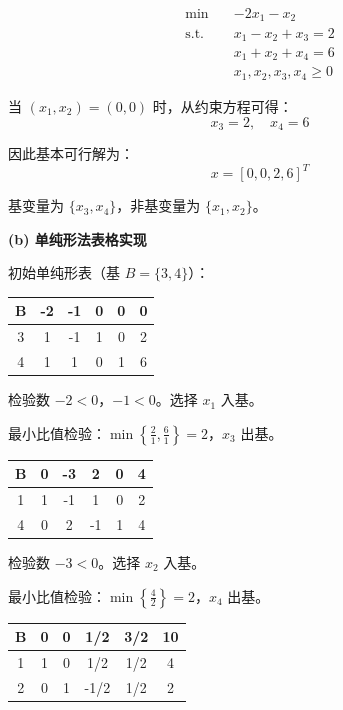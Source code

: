 \documentclass[12pt,a4paper]{article}
\begin{document}
\begin{align*}
\min \quad & -2x_1 - x_2 \\
\text{s.t.} \quad & x_1 - x_2 + x_3 = 2 \\
& x_1 + x_2 + x_4 = 6 \\
& x_1, x_2, x_3, x_4 \geq 0
\end{align*}

当 $(x_1, x_2) = (0, 0)$ 时，从约束方程可得：
\[
x_3 = 2, \quad x_4 = 6
\]

因此基本可行解为：
\[
x = [0, 0, 2, 6]^T
\]

基变量为 $\{x_3, x_4\}$，非基变量为 $\{x_1, x_2\}$。

\textbf{(b) 单纯形法表格实现}

初始单纯形表（基 $B = \{3, 4\}$）：

\begin{table}[h]
\centering
\begin{tabular}{|c|cccc|c|}
\hline
B & -2 & -1 & 0 & 0 & 0 \\
\hline
3 & 1 & -1 & 1 & 0 & 2 \\
4 & 1 & 1 & 0 & 1 & 6 \\
\hline
\end{tabular}
\end{table}

检验数 $-2 < 0$，$-1 < 0$。选择 $x_1$ 入基。

最小比值检验：$\min\left\{\frac{2}{1}, \frac{6}{1}\right\} = 2$，$x_3$ 出基。


\begin{table}[h]
\centering
\begin{tabular}{|c|cccc|c|}
\hline
B & 0 & -3 & 2 & 0 & 4 \\
\hline
1 & 1 & -1 & 1 & 0 & 2 \\
4 & 0 & 2 & -1 & 1 & 4 \\
\hline
\end{tabular}
\end{table}

检验数 $-3 < 0$。选择 $x_2$ 入基。

最小比值检验：$\min\left\{\frac{4}{2}\right\} = 2$，$x_4$ 出基。



\begin{table}[h]
\centering
\begin{tabular}{|c|cccc|c|}
\hline
B & 0 & 0 & 1/2 & 3/2 & 10 \\
\hline
1 & 1 & 0 & 1/2 & 1/2 & 4 \\
2 & 0 & 1 & -1/2 & 1/2 & 2 \\
\hline
\end{tabular}
\end{table}
\end{document}
